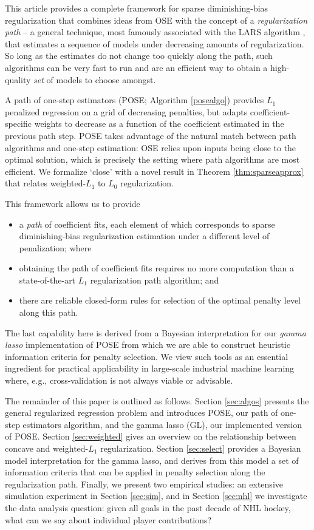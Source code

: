 \documentclass[12pt]{article}
\begin{document}
This article provides a complete framework for sparse diminishing-bias
regularization that combines ideas from OSE with the concept of a
\textit{regularization path} -- a general technique, most famously associated
with the LARS algorithm \citep{efron_least_2004}, that estimates a sequence of
models under decreasing amounts of regularization.  So long as the estimates do not change too quickly along the path, such  algorithms can be very fast to run and are an efficient way to obtain a high-quality \textit{set} of models to choose amongst.  

A path of one-step estimators (POSE; Algorithm \ref{posealgo})
provides $L_1$ penalized regression  on a grid of decreasing
penalties, but adapts coefficient-specific weights to decrease as a function
of the coefficient estimated in the previous path step.  POSE takes advantage
of the natural match between path algorithms and one-step estimation: OSE
relies upon inputs being close to the optimal solution, which is precisely the
setting where path algorithms are most efficient.  We formalize `close' with a novel result in Theorem \ref{thm:sparseapprox} that relates weighted-$L_1$ to $L_0$ regularization.

This framework allows us to provide 
\begin{itemize}
\item a {\it path} of coefficient fits, each element of which corresponds to sparse diminishing-bias regularization estimation under a different level of penalization; where
\item obtaining the path of coefficient fits requires no more computation than  a state-of-the-art $L_1$ regularization path algorithm; and
\item there are reliable closed-form rules for selection of the optimal penalty level along this path.
\end{itemize}
The last capability here is derived from a Bayesian interpretation for our \textit{gamma lasso} implementation of POSE from which we are able to construct heuristic information criteria for penalty selection.
We view such tools as an essential ingredient for practical applicability in large-scale industrial machine learning where, e.g., cross-validation is not always viable or advisable.


The remainder of this paper is outlined as follows.  Section \ref{sec:algos}
presents the general regularized regression problem and introduces POSE, our
path of one-step estimators algorithm, and the gamma lasso (GL), our
implemented version of POSE.  Section \ref{sec:weighted} gives an overview on
the relationship between concave and weighted-$L_1$ regularization. Section \ref{sec:select} provides a Bayesian model interpretation
for the gamma lasso, and derives from this model a set of information criteria
that can be applied in penalty selection along the regularization path.
Finally, we present two empirical studies:
an extensive  simulation experiment in Section \ref{sec:sim}, and in Section \ref{sec:nhl} we investigate the data analysis question: given all goals in the past decade of NHL hockey, what can we say about individual player contributions? 
\end{document}
